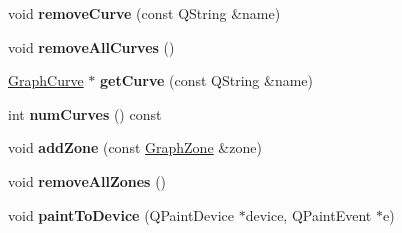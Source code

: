 \begin{DoxyCompactItemize}
\item 
\hypertarget{class_graph_view_abb23c6f07aadd1a94fdd2611d4f25417}{void {\bfseries remove\-Curve} (const Q\-String \&name)}\label{class_graph_view_abb23c6f07aadd1a94fdd2611d4f25417}

\item 
\hypertarget{class_graph_view_a88547633084897d8d5ce95119ad3d4fb}{void {\bfseries remove\-All\-Curves} ()}\label{class_graph_view_a88547633084897d8d5ce95119ad3d4fb}

\item 
\hypertarget{class_graph_view_a3f7ad3b4f9951c8e20220d18e09e46b5}{\hyperlink{class_graph_curve}{Graph\-Curve} $\ast$ {\bfseries get\-Curve} (const Q\-String \&name)}\label{class_graph_view_a3f7ad3b4f9951c8e20220d18e09e46b5}

\item 
\hypertarget{class_graph_view_a87b3c92c1a6aa142f4392a4bdd6fb16f}{int {\bfseries num\-Curves} () const }\label{class_graph_view_a87b3c92c1a6aa142f4392a4bdd6fb16f}

\item 
\hypertarget{class_graph_view_a6f1e6c3042ad6dd78f5b289e3987c25a}{void {\bfseries add\-Zone} (const \hyperlink{class_graph_zone}{Graph\-Zone} \&zone)}\label{class_graph_view_a6f1e6c3042ad6dd78f5b289e3987c25a}

\item 
\hypertarget{class_graph_view_a2335ac9d557b4c7e3e2baab243724f6f}{void {\bfseries remove\-All\-Zones} ()}\label{class_graph_view_a2335ac9d557b4c7e3e2baab243724f6f}

\item 
\hypertarget{class_graph_view_a88c42b9d9967cc5b2cbe2a411d7e6b5d}{void {\bfseries paint\-To\-Device} (Q\-Paint\-Device $\ast$device, Q\-Paint\-Event $\ast$e)}\label{class_graph_view_a88c42b9d9967cc5b2cbe2a411d7e6b5d}

\end{DoxyCompactItemize}
